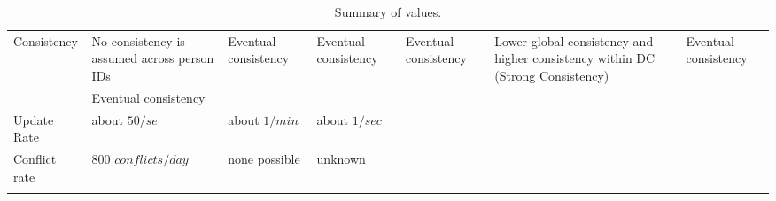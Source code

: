 \begin{landscape}
\begin{center}
\begin{longtable}{|p{2.2cm}||p{3.6cm}|p{3.4cm}|p{3.4cm}||p{3.8cm}|p{3.4cm}|p{3.1cm}|}
			Consistency & 
				No consistency is assumed across person IDs & 
				Eventual consistency & 
				Eventual consistency & 
				Eventual consistency & 
				\multirow{2}{3.6cm}{Lower global consistency and higher consistency within DC (Strong Consistency)} & 
				Eventual consistency \\ \cline{2-2}
	
				 & 
				Eventual consistency & 
				 & 
				 & 
				 & 
				 & 
				  \\
			\hline
				  
				Update Rate & 
				about $50/se$ &
				about $1 / min$ & 
				about $1 / sec$ & 
				 & 
				 & 
				 \\
			\hline
			
			  Conflict rate	& 
			  800 $conflicts/ day$	& 
			  none possible	& 
			  unknown & 
			   & 
			   & 
			   \\
			\hline
		
			\caption{Summary of values.}
			\label{tbl:metrics}
		\end{longtable}
	\end{center}
\end{landscape}